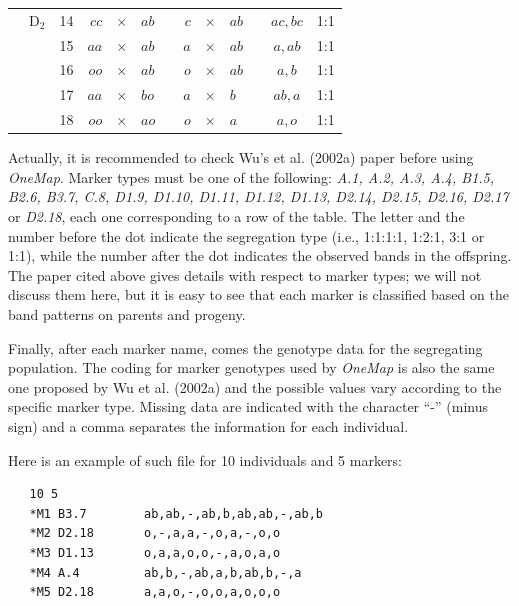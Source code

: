 \documentclass[letterpaper,12pt,oneside]{article}
\begin{document}
\begin{table}[!ht]
\begin{tabular}{c c r r c l c r c l c c c}
          &D$_2$& 14& $cc $ & $\times$ & $ ab$  & & $c  $ & $\times$ & $ ab$  & & $ac, bc$         & 1:1 \\
          &     & 15& $aa $ & $\times$ & $ ab$  & & $a $  & $\times$ & $ ab$  & & $a, ab$          & 1:1 \\
          &     & 16& $oo $ & $\times$ & $ ab$  & & $o $  & $\times$ & $ ab$  & & $a, b$           & 1:1 \\
          &     & 17& $aa $ & $\times$ & $ bo$  & & $a  $ & $\times$ & $ b$   & & $ab, a$          & 1:1 \\
          &     & 18& $oo $ & $\times$ & $ ao$  & & $o $  & $\times$ & $  a$  & & $a, o$           & 1:1 \\
        \hline \hline
      \end{tabular}
\end{table}

\vspace{.5cm}

Actually, it is recommended to check Wu's et al. (2002a) paper before using {\sl OneMap}. Marker types must be one of the following: {\sl A.1, A.2, A.3, A.4, B1.5, B2.6, B3.7, C.8, D1.9, D1.10, D1.11, D1.12, D1.13, D2.14, D2.15, D2.16, D2.17} or {\sl D2.18}, each one corresponding to a row of the table. The letter and the number before the dot indicate the segregation type (i.e., 1:1:1:1, 1:2:1, 3:1 or 1:1), while the number after the dot indicates the observed bands in the offspring. The paper cited above gives details with respect to marker types; we will not discuss them here, but it is easy to see that each marker is classified based on the band patterns on parents and progeny.

Finally, after each marker name, comes the genotype data for the segregating population. The coding for marker genotypes used by {\sl OneMap} is also the same one proposed by Wu et al. (2002a) and the possible values vary according to the specific marker type. Missing data are indicated with the character ``-'' (minus sign) and a comma separates the information for each individual.

Here is an example of such file for 10 individuals and 5 markers:

\begin{verbatim}
   10 5
   *M1 B3.7        ab,ab,-,ab,b,ab,ab,-,ab,b
   *M2 D2.18       o,-,a,a,-,o,a,-,o,o
   *M3 D1.13       o,a,a,o,o,-,a,o,a,o
   *M4 A.4         ab,b,-,ab,a,b,ab,b,-,a
   *M5 D2.18       a,a,o,-,o,o,a,o,o,o
\end{verbatim}
\end{document}
